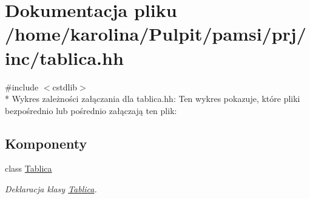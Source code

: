 \hypertarget{tablica_8hh}{\section{Dokumentacja pliku /home/karolina/\-Pulpit/pamsi/prj/inc/tablica.hh}
\label{tablica_8hh}
}
{\ttfamily \#include $<$cstdlib$>$}\\*
Wykres zależności załączania dla tablica.\-hh\-:
Ten wykres pokazuje, które pliki bezpośrednio lub pośrednio załączają ten plik\-:
\subsection*{Komponenty}
\begin{DoxyCompactItemize}
\item 
class \hyperlink{class_tablica}{Tablica}
\begin{DoxyCompactList}\small\item\em Deklaracja klasy \hyperlink{class_tablica}{Tablica}. \end{DoxyCompactList}\end{DoxyCompactItemize}
